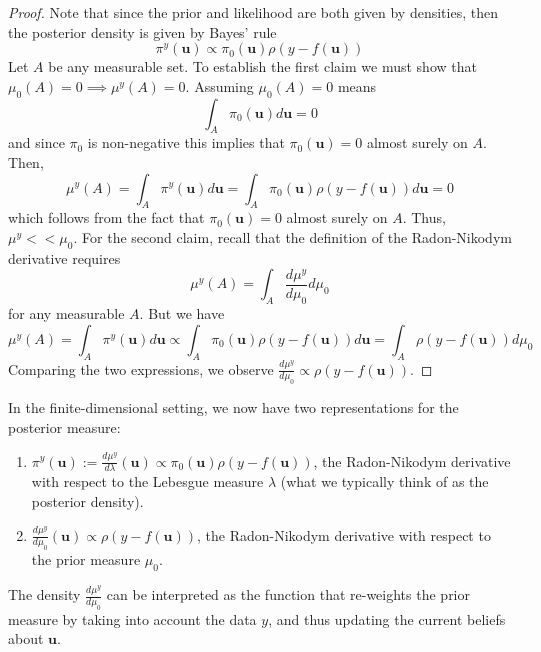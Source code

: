 \documentclass[12pt]{article}
\newcommand{\bpar}{\mathbf{u}} %
\begin{document}
\begin{proof} 
Note that since the prior and likelihood are both given by densities, then the posterior density is given by Bayes' rule
\[\pi^y(\bpar) \propto \pi_0(\bpar) \rho(y - f(\bpar))\]
Let $A$ be any measurable set. To establish the first claim we must show that $\mu_0(A) = 0 \implies \mu^y(A) = 0$. Assuming $\mu_0(A) = 0$ means
\[\int_A \pi_0(\bpar) d\bpar = 0\]
and since $\pi_0$ is non-negative this implies that $\pi_0(\bpar) = 0$ almost surely on $A$. Then, 
\[\mu^y(A) = \int_A \pi^y(\bpar) d\bpar = \int_A \pi_0(\bpar) \rho(y - f(\bpar)) d\bpar = 0\]
which follows from the fact that $\pi_0(\bpar) = 0$ almost surely on $A$. Thus, $\mu^y << \mu_0$. For the second claim, recall that the definition of the Radon-Nikodym derivative requires 
\[\mu^y(A) = \int_A \frac{d\mu^y}{d\mu_0} d\mu_0\]
for any measurable $A$. But we have 
\[\mu^y(A) = \int_A \pi^y(\bpar) d\bpar \propto \int_A \pi_0(\bpar) \rho(y - f(\bpar)) d\bpar = \int_A \rho(y - f(\bpar)) d\mu_0 \]
Comparing the two expressions, we observe $\frac{d\mu^y}{d\mu_0} \propto \rho(y - f(\bpar))$. 
\end{proof} 
In the finite-dimensional setting, we now have two representations for the posterior measure:
\begin{enumerate}
\item $\pi^y(\bpar) := \frac{d\mu^y}{d\lambda}(\bpar) \propto \pi_0(\bpar)\rho(y - f(\bpar))$, the Radon-Nikodym derivative with respect to the Lebesgue measure $\lambda$ (what we typically think of as the posterior density).
\item $\frac{d\mu^y}{d\mu_0}(\bpar) \propto \rho(y - f(\bpar))$, the Radon-Nikodym derivative with respect to the prior measure $\mu_0$. 
\end{enumerate}
The density $\frac{d\mu^y}{d\mu_0}$ can be interpreted as the function that re-weights the prior measure by taking into account the data $y$, and thus updating the current beliefs about $\bpar$. 
\end{document}
